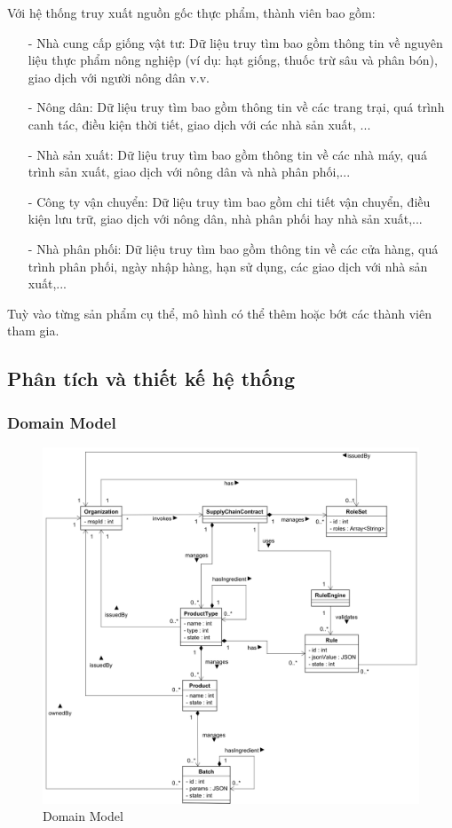 Với hệ thống truy xuất nguồn gốc thực phẩm, thành viên bao gồm: 
\begin{itemize}
    \item[-] Nhà cung cấp giống vật tư: Dữ liệu truy tìm bao gồm thông tin về nguyên liệu 
    thực phẩm nông nghiệp (ví dụ: hạt giống, thuốc trừ sâu và phân bón), giao dịch với người nông dân v.v.
    \item[-] Nông dân: Dữ liệu truy tìm bao gồm thông tin về các trang trại, quá trình canh tác,
    điều kiện thời tiết, giao dịch với các nhà sản xuất, ...
    \item[-] Nhà sản xuất: Dữ liệu truy tìm bao gồm thông tin về các nhà máy, quá trình sản xuất,
    giao dịch với nông dân và nhà phân phối,...
    \item[-] Công ty vận chuyển: Dữ liệu truy tìm bao gồm chi tiết vận chuyển, điều kiện lưu trữ, giao
    dịch với nông dân, nhà phân phối hay nhà sản xuất,...
    \item[-] Nhà phân phối: Dữ liệu truy tìm bao gồm thông tin về các cửa hàng, quá trình phân phối,
    ngày nhập hàng, hạn sử dụng, các giao dịch với nhà sản xuất,...
\end{itemize}

Tuỳ vào từng sản phẩm cụ thể, mô hình có thể thêm hoặc bớt các thành viên tham gia. 
\subsection{Phân tích và thiết kế hệ thống}
\subsubsection{Domain Model}

\begin{figure}[h]
    \centering
    \includegraphics[width=1\textwidth]{images/domain_model.png}
    \caption{Domain Model } 
\end{figure}

